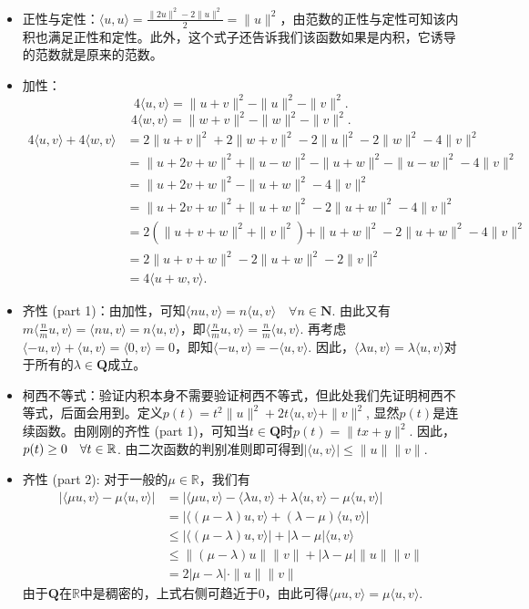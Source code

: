 \documentclass[hyperref,]{ctexart}
\begin{document}
\begin{itemize}
\item
  正性与定性：\(\langle u,u\rangle = \frac{\|2u\|^2-2\|u\|^2}{2} = \|u\|^2\)，由范数的正性与定性可知该内积也满足正性和定性。此外，这个式子还告诉我们该函数如果是内积，它诱导的范数就是原来的范数。
\item
  加性： \[4\langle u,v\rangle = \|u+v\|^2 - \|u\|^2-\|v\|^2.\]
  \[4\langle w,v\rangle = \|w+v\|^2 - \|w\|^2-\|v\|^2.\] \[
  \begin{aligned}
  4 \langle u,v\rangle+ 4\langle w,v\rangle & = 2\|u+v\|^2+2\|w+v\|^2 - 2\|u\|^2-2\|w\|^2-4\|v\|^2\\
  &=\|u+2v+w\|^2+\|u-w\|^2  - \|u+w\|^2-\|u-w\|^2-4\|v\|^2\\
  & = \|u+2v+w\|^2  - \|u+w\|^2-4\|v\|^2\\
  & = \|u+2v+w\|^2 + \|u+w\|^2 - 2 \|u+w\|^2 - 4\|v\|^2\\
  & = 2 (\|u+v+w\|^2+\|v\|^2)+ \|u+w\|^2 - 2 \|u+w\|^2 - 4\|v\|^2\\
  & = 2 \|u+v+w\|^2 - 2\|u+w\|^2-2\|v\| ^2\\
  &= 4\langle u+w,v\rangle.
  \end{aligned}\]
\item
  齐性 (part
  1)：由加性，可知\(\langle nu,v\rangle = n\langle u,v\rangle\quad \forall n\in \mathbf{N}\).
  由此又有\(m \langle \frac{n}{m}u,v\rangle = \langle nu,v\rangle = n\langle u,v\rangle\)，即\(\langle \frac{n}{m}u,v\rangle = \frac{n}{m}\langle u,v\rangle\).
  再考虑\(\langle -u,v\rangle +\langle u,v\rangle =\langle 0,v\rangle=0\)，即知\(\langle -u,v\rangle = -\langle u,v\rangle\).
  因此，\(\langle \lambda u,v\rangle = \lambda \langle u,v\rangle\)对于所有的\(\lambda \in \mathbf{Q}\)成立。
\item
  柯西不等式：验证内积本身不需要验证柯西不等式，但此处我们先证明柯西不等式，后面会用到。定义\(p(t)=t^2\|u\|^2+2t\langle u,v\rangle+\|v\|^2\),
  显然\(p(t)\)是连续函数。由刚刚的齐性 (part
  1)，可知当\(t\in\mathbf{Q}\)时\(p(t) = \|tx+y\|^2\).
  因此，\(p(t)\ge 0\quad\forall t \in \mathbb{R}\).
  由二次函数的判别准则即可得到\(|\langle u,v\rangle|\le \|u\|\|v\|.\)
\item
  齐性 (part 2): 对于一般的\(\mu\in\mathbb{R}\)，我们有 \[
  \begin{aligned}
  | \langle \mu u,v\rangle - \mu \langle u,v\rangle| &=
  | \langle \mu u,v\rangle - \langle\lambda u,v\rangle +\lambda \langle u,v\rangle-\mu \langle u,v\rangle|\\
  &=|\langle (\mu-\lambda)u,v\rangle+ (\lambda-\mu)\langle u,v\rangle|\\
  &\le  |\langle (\mu-\lambda)u,v\rangle| + |\lambda-\mu|\langle u,v\rangle\\
  &\le \|(\mu-\lambda)u\|\|v\| + |\lambda-\mu| \|u\|\|v\|\\
  &= 2|\mu-\lambda|\cdot \|u\|\|v\|
  \end{aligned}
  \]
  由于\(\mathbf{Q}\)在\(\mathbb{R}\)中是稠密的，上式右侧可趋近于0，由此可得\(\langle \mu u,v\rangle = \mu \langle u,v\rangle\).
\end{itemize}
\end{document}

